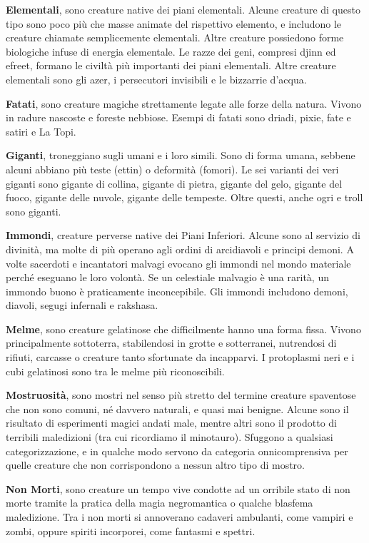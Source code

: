 \begin{multicols}{2}
	\smallskip\textbf{Elementali}, sono creature native dei piani elementali. Alcune creature di questo tipo sono poco più che masse animate del rispettivo elemento, e includono le creature chiamate semplicemente elementali. Altre creature possiedono forme biologiche infuse di energia elementale. Le razze dei geni, compresi djinn ed efreet, formano le civiltà più importanti dei piani elementali. Altre creature elementali sono gli azer, i persecutori invisibili e le bizzarrie d'acqua.

	\smallskip\textbf{Fatati}, sono creature magiche strettamente legate alle forze della natura. Vivono in radure nascoste e foreste nebbiose. Esempi di fatati sono driadi, pixie, fate e satiri e La Topi.

	\smallskip\textbf{Giganti}, troneggiano sugli umani e i loro simili. Sono di forma umana, sebbene alcuni abbiano più teste (ettin) o deformità (fomori). Le sei varianti dei veri giganti sono gigante di collina, gigante di pietra, gigante del gelo, gigante del fuoco, gigante delle nuvole, gigante delle tempeste. Oltre questi, anche ogri e troll sono giganti.

	\smallskip\textbf{Immondi}, creature perverse native dei Piani Inferiori. Alcune sono al servizio di divinità, ma molte di più operano agli ordini di arcidiavoli e principi demoni. A volte sacerdoti e incantatori malvagi evocano gli immondi nel mondo materiale perché eseguano le loro volontà. Se un celestiale malvagio è una rarità, un immondo buono è praticamente inconcepibile. Gli immondi includono demoni, diavoli, segugi infernali e rakshasa.

	\smallskip\textbf{Melme}, sono creature gelatinose che difficilmente hanno una forma fissa. Vivono principalmente sottoterra, stabilendosi in grotte e sotterranei, nutrendosi di rifiuti, carcasse o creature tanto sfortunate da incapparvi. I protoplasmi neri e i cubi gelatinosi sono tra le melme più riconoscibili.

	\smallskip\textbf{Mostruosità}, sono mostri nel senso più stretto del termine creature spaventose che non sono comuni, né davvero naturali, e quasi mai benigne. Alcune sono il risultato di esperimenti magici andati male, mentre altri sono il prodotto di terribili maledizioni (tra cui ricordiamo il minotauro). Sfuggono a qualsiasi categorizzazione, e in qualche modo servono da categoria onnicomprensiva per quelle creature che non corrispondono a nessun altro tipo di mostro.

	\smallskip\textbf{Non Morti}, sono creature un tempo vive condotte ad un orribile stato di non morte tramite la pratica della magia negromantica o qualche blasfema maledizione. Tra i non morti si annoverano cadaveri ambulanti, come vampiri e zombi, oppure spiriti incorporei, come fantasmi e spettri.


\end{multicols}
